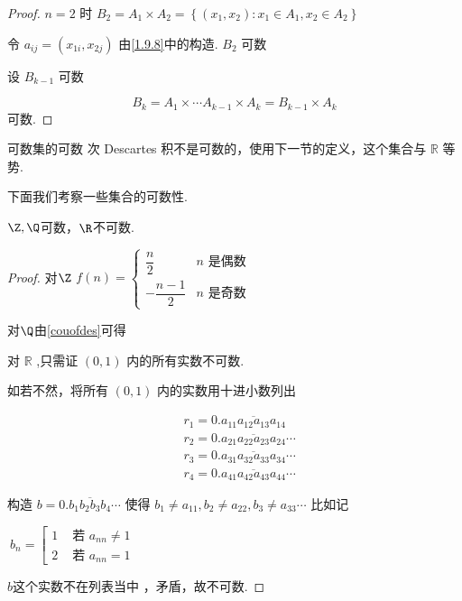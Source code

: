 \begin{proof}
	$n=2$ 时 $ B_2=A_1 \times A_2=\left\{\left(x_1, x_2\right): x_1 \in A_1, x_2 \in A_2\right\}$
	
	令 $a_{i j}=\left(x_{1 i} , x_{2 j}\right)$ 由\ref{1.9.8}中的构造. $B_2$ 可数
	
	设 $B_{k-1}$ 可数
	
	$$
	B_k=A_1 \times \cdots A_{k-1} \times A_k=B_{k-1} \times A_k
	$$
	可数.
\end{proof}

\begin{remark}
	可数集的可数 次 Descartes 积不是可数的，使用下一节的定义，这个集合与 $\mathbb{R}$ 等势.
\end{remark}

下面我们考察一些集合的可数性.
\begin{proposition}
		$\Z,\Q$可数，$\R$不可数.
\end{proposition}

\begin{proof}
	对$\Z$ $f(n)=\left\{\begin{array}{cc}\dfrac{n}{2} & n \text { 是偶数 } \\ -\dfrac{n-1}{2} & n \text { 是奇数 }\end{array}\right.$
	
	对$\Q$由\ref{couofdes}可得
	
	对 $\mathbb{R}$ ,只需证 $(0,1)$ 内的所有实数不可数.
	
	如若不然，将所有 $(0,1)$ 内的实数用十进小数列出
	
	$$
	\begin{aligned}
		& r_1=0 . \overline{a_{11} a_{12} a_{13} a_{14}} \\
		& r_2=0 . \overline{a_{21} a_{22} a_{23} a_{24}} \cdots \\
		& r_3=0 . \overline{a_{31} a_{32} a_{33} a_{34}} \cdots \\
		& r_4=0 . \overline{a_{41} a_{42} a_{43} a_{44}} \cdots
	\end{aligned}
	$$
	
	
	构造 $b=0 . \overline{b_1 b_2 b_3 b_4} \cdots$ 使得 $b_1 \neq a_{11}, b_2 \neq a_{22}, b_3 \neq a_{33} \cdots$
	比如记 
	
	$\ b_n=\left[\begin{array}{ll}1 & \text { 若 }a_{n n} \neq 1 \\ 2 &\text { 若 } a_{n n}=1\end{array}\right.$
	
	$b$这个实数不在列表当中 ，矛盾，故不可数.
\end{proof}


